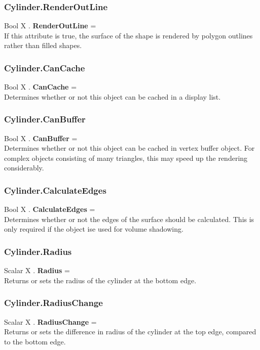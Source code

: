 \documentclass[10pt]{book}
\begin{document}
\subsubsection{Cylinder.RenderOutLine \label{F:Cylinder:RenderOutLine}}
Bool X . \textbf{RenderOutLine} = \\
If this attribute is true, the surface of the shape is rendered by polygon outlines rather than filled shapes.

\subsubsection{Cylinder.CanCache \label{F:Cylinder:CanCache}}
Bool X . \textbf{CanCache} = \\
Determines whether or not this object can be cached in a display list.

\subsubsection{Cylinder.CanBuffer \label{F:Cylinder:CanBuffer}}
Bool X . \textbf{CanBuffer} = \\
Determines whether or not this object can be cached in vertex buffer object. For complex objects consisting of many triangles, this may speed up the rendering considerably.

\subsubsection{Cylinder.CalculateEdges \label{F:Cylinder:CalculateEdges}}
Bool X . \textbf{CalculateEdges} = \\
Determines whether or not the edges of the surface should be calculated. This is only required if the object ise used for volume shadowing.

\subsubsection{Cylinder.Radius \label{F:Cylinder:Radius}}
Scalar X . \textbf{Radius} = \\
Returns or sets the radius of the cylinder at the bottom edge.

\subsubsection{Cylinder.RadiusChange \label{F:Cylinder:RadiusChange}}
Scalar X . \textbf{RadiusChange} = \\
Returns or sets the difference in radius of the cylinder at the top edge, compared to the bottom edge.
\end{document}
